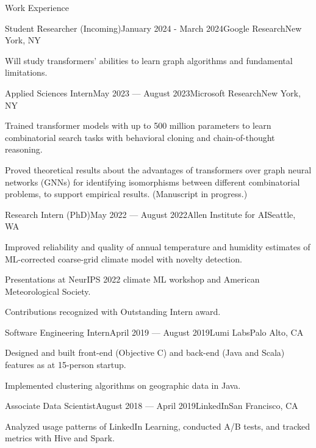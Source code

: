 \documentclass{resume} %
\begin{document}
\begin{rSection}{Work Experience}

\begin{rSubsection}{Student Researcher (Incoming)}{January 2024 - March 2024}{Google Research}{New York, NY}
\item Will study transformers' abilities to learn graph algorithms and fundamental limitations.
\end{rSubsection}

\begin{rSubsection}{Applied Sciences Intern}{May 2023 --- August 2023}{Microsoft Research}{New York, NY}
\item Trained transformer models with up to 500 million parameters to learn combinatorial search tasks with behavioral cloning and chain-of-thought reasoning.
\item Proved theoretical results about the advantages of transformers over graph neural networks (GNNs) for identifying isomorphisms between different combinatorial problems, to support empirical results. (Manuscript in progress.) 
\end{rSubsection}

\begin{rSubsection}{Research Intern (PhD)}{May 2022 --- August 2022}{Allen Institute for AI}{Seattle, WA}
\item Improved reliability and quality of annual temperature and humidity estimates of ML-corrected coarse-grid climate model with novelty detection.
\item Presentations at NeurIPS 2022 climate ML workshop and American Meteorological Society.
\item Contributions recognized with Outstanding Intern award.
\end{rSubsection}


\begin{rSubsection}{Software Engineering Intern}{April 2019 --- August 2019}{Lumi Labs}{Palo Alto, CA}
\item Designed and built front-end (Objective C) and back-end (Java and Scala) features as at 15-person startup.
\item Implemented clustering algorithms on geographic data in Java.
\end{rSubsection}

\begin{rSubsection}{Associate Data Scientist}{August 2018 --- April 2019}{LinkedIn}{San Francisco, CA}
\item Analyzed usage patterns of LinkedIn Learning, conducted A/B tests, and tracked metrics with Hive and Spark.
\end{rSubsection}
\end{rSection}
\end{document}

